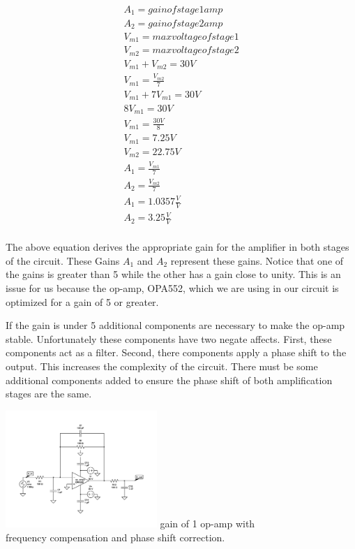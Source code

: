 \documentclass{article}	%
\begin{document}
\begin{multicols}{2}
\begin{gather*}
A_1 = gain of stage 1 amp \\ 
A_2 = gain of stage 2 amp\\
V_{m1} = max voltage of stage 1\\
V_{m2} = max voltage of stage 2\\
V_{m1} + V_{m2} = 30V\\
V_{m1} = \frac{V_{m2}}{7}\\
V_{m1} + 7V_{m1} = 30V\\
8V_{m1} = 30V\\
V_{m1} = \frac{30V}{8}\\
V_{m1} = 7.25V\\
V_{m2} = 22.75V\\
A_1 = \frac{V_{m1}}{7}\\
A_2 = \frac{V_{m2}}{7}\\
A_1 = 1.0357\frac{V}{V}\\
A_2 = 3.25\frac{V}{V}\\
\end{gather*}

The above equation derives the appropriate
gain for the amplifier in both stages
of the circuit.
These Gains $A_1$ and $A_2$ represent these gains.
Notice that one of the gains is greater than
5 while the other has a gain close to unity.
This is an issue for us because the op-amp,
OPA552, which we are using in our circuit is 
optimized for a gain of 5 or greater.

If the gain is under 5 additional components
are necessary to make the op-amp stable.
Unfortunately these components have two negate affects.
First, these components act as a filter.
Second, there components apply a phase shift to the output.
This increases the complexity of the circuit.
There must be some additional components added
to ensure the phase shift of both amplification stages are the same.

\begin{center}
\includegraphics[width=0.43\textwidth,keepaspectratio]{gain_one_552.pdf}
gain of 1 op-amp with\\ frequency compensation and phase shift correction.
\end{center}


\end{multicols}
\end{document}
